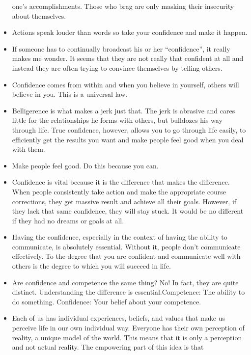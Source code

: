 \begin{itemize}
        one’s accomplishments. Those who brag are only masking their insecurity about themselves.
        \item Actions speak louder than words so take your confidence and
        make it happen.
        \item If someone has to continually broadcast his or her “confidence”, it really makes me wonder. It
        seems that they are not really that confident at all and instead they are often trying to convince
        themselves by telling others.
        \item Confidence comes from within and when you believe in yourself, others will believe in you. This is
        a universal law.
        \item Belligerence is what makes a jerk just that. The jerk is abrasive and cares little for the relationships
        he forms with others, but bulldozes his way through life. True confidence, however, allows you to
        go through life easily, to efficiently get the results you want and make people feel good when you
        deal with them.
        \item Make people feel good. Do this because you can.
        \item Confidence is vital because it is the difference that
        makes the difference. When people consistently take action and make the appropriate course
        corrections, they get massive result and achieve all their goals. However, if they lack that same
        confidence, they will stay stuck. It would be no different if they had no dreams or goals at all.
        \item Having the confidence, especially in the context of having the ability to communicate, is absolutely
        essential. Without it, people don’t communicate effectively. To the degree that you are confident
        and communicate well with others is the degree to which you will succeed in life.
        \item Are confidence and competence the same thing? No! In fact, they are quite distinct. Understanding
        the difference is essential.Competence: The ability to do something. Confidence: Your belief about your competence.
        \item Each of us has individual experiences, beliefs, and values that make us perceive life in our own
        individual way. Everyone has their own perception of reality, a unique model of the world. This
        means that it is only a perception and not actual reality. The empowering part of this idea is that

\end{itemize}
